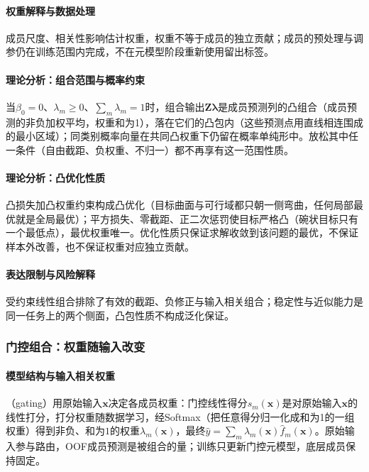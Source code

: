 \paragraph{权重解释与数据处理}
成员尺度、相关性影响估计权重，权重不等于成员的独立贡献；成员的预处理与调参仍在训练范围内完成，不在元模型阶段重新使用留出标签。

\paragraph{理论分析：组合范围与概率约束}
当$\beta_0=0$、$\lambda_m\ge0$、$\sum_m\lambda_m=1$时，组合输出$\bm Z\bm\lambda$是成员预测列的凸组合（成员预测的非负加权平均，权重和为1），落在它们的凸包内（这些预测点用直线相连围成的最小区域）；同类别概率向量在共同凸权重下仍留在概率单纯形中。放松其中任一条件（自由截距、负权重、不归一）都不再享有这一范围性质。

\paragraph{理论分析：凸优化性质}
凸损失加凸权重约束构成凸优化（目标曲面与可行域都只朝一侧弯曲，任何局部最优就是全局最优）；平方损失、零截距、正二次惩罚使目标严格凸（碗状目标只有一个最低点），最优权重唯一。优化性质只保证求解收敛到该问题的最优，不保证样本外改善，也不保证权重对应独立贡献。

\paragraph{表达限制与风险解释}
受约束线性组合排除了有效的截距、负修正与输入相关组合；稳定性与近似能力是同一任务上的两个侧面，凸包性质不构成泛化保证。

\subsubsection{门控组合：权重随输入改变}
\label{sec:ensemble-stacking-input-dependent}

\paragraph{模型结构与输入相关权重}
（gating）用原始输入$\bm x$决定各成员权重：门控线性得分$s_m(\bm x)$是对原始输入$\bm x$的线性打分，打分权重随数据学习，经Softmax（把任意得分归一化成和为1的一组权重）得到非负、和为$1$的权重$\lambda_m(\bm x)$，最终$\hat y=\sum_m\lambda_m(\bm x)\hat f_m(\bm x)$。原始输入参与路由，OOF成员预测是被组合的量；训练只更新门控元模型，底层成员保持固定。

